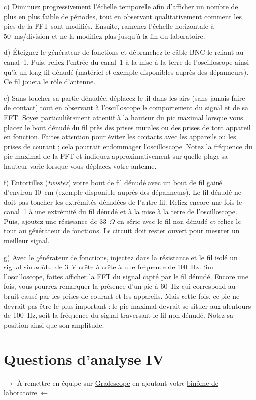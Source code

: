 \documentclass[canadien,12pt,oneside,letterpaper]{article}
\begin{document}
c) Diminuez progressivement l'échelle temporelle afin d'afficher un nombre de plus en plus faible de périodes, tout en observant qualitativement comment les pics de la FFT sont modifiés. Ensuite, ramenez l'échelle horizontale à 50~ms/division et ne la modifiez plus jusqu'à la fin du laboratoire.

d) Éteignez le générateur de fonctions et débranchez le câble BNC le reliant au canal~1. Puis, reliez l'entrée du canal~1 à la mise à la terre de l'oscilloscope ainsi qu'à un long fil dénudé (matériel et exemple disponibles auprès des dépanneurs). Ce fil jouera le rôle d'antenne.

e) Sans toucher sa partie dénudée, déplacez le fil dans les airs (sans jamais faire de contact) tout en observant à l'oscilloscope le comportement du signal et de sa FFT. Soyez particulièrement attentif à la hauteur du pic maximal lorsque vous placez le bout dénudé du fil près des prises murales ou des prises de tout appareil en fonction. Faites attention pour éviter les contacts avec les appareils ou les prises de courant ; cela pourrait endommager l'oscilloscope! Notez la fréquence du pic maximal de la FFT et indiquez approximativement sur quelle plage sa hauteur varie lorsque vous déplacez votre antenne.

f) Entortillez (\textit{twistez}) votre bout de fil dénudé avec un bout de fil gainé d'environ 10~cm (exemple disponible auprès des dépanneurs). Le fil dénudé ne doit pas toucher les extrémités dénudées de l'autre fil. Reliez encore une fois le canal~1 à une extrémité du fil dénudé et à la mise à la terre de l'oscilloscope. Puis, ajoutez une résistance de 33~$\Omega$ en série avec le fil non dénudé et reliez le tout au générateur de fonctions. Le circuit doit rester ouvert pour mesurer un meilleur signal.

g) Avec le générateur de fonctions, injectez dans la résistance et le fil isolé un signal sinusoïdal de 3~V crête à crête à une fréquence de 100~Hz. Sur l'oscilloscope, faites afficher la FFT du signal capté par le fil dénudé. Encore une fois, vous pourrez remarquer la présence d'un pic à 60~Hz qui correspond au bruit causé par les prises de courant et les appareils. Mais cette fois, ce pic ne devrait pas être le plus important : le pic maximal devrait se situer aux alentours de 100~Hz, soit la fréquence du signal traversant le fil non dénudé. Notez sa position ainsi que son amplitude.


\section{Questions d'analyse IV} \label{sec:grade}
\vspace{-0.5cm}
\noindent$\rightarrow$ À remettre en équipe sur \href{https://www.gradescope.com/}{Gradescope} en ajoutant votre \href{https://help.gradescope.com/article/m5qz2xsnjy-student-add-group-members}{binôme de laboratoire} $\leftarrow$
\end{document}

